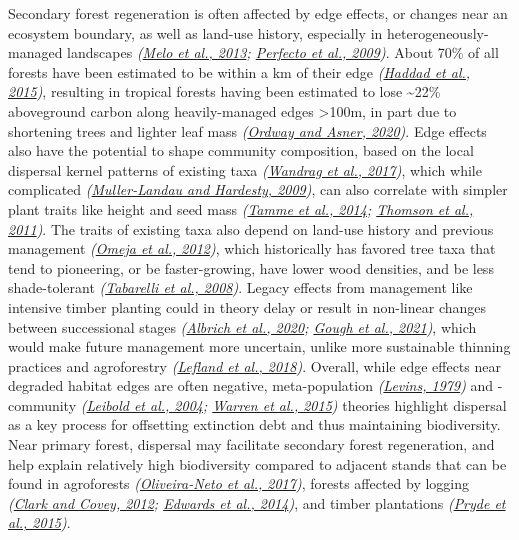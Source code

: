 \documentclass[
  12pt,
]{article}
\begin{document}
Secondary forest regeneration is often affected by edge effects, or changes near an ecosystem boundary, as well as land-use history, especially in heterogeneously-managed landscapes \emph{(\protect\hyperlink{ref-melo13}{Melo et al., 2013}; \protect\hyperlink{ref-perfecto09}{Perfecto et al., 2009})}.
About 70\% of all forests have been estimated to be within a km of their edge \emph{(\protect\hyperlink{ref-haddad15}{Haddad et al., 2015})}, resulting in tropical forests having been estimated to lose \textasciitilde22\% aboveground carbon along heavily-managed edges \textgreater100m, in part due to shortening trees and lighter leaf mass \emph{(\protect\hyperlink{ref-ordway20}{Ordway and Asner, 2020})}.
Edge effects also have the potential to shape community composition, based on the local dispersal kernel patterns of existing taxa \emph{(\protect\hyperlink{ref-wandrag17}{Wandrag et al., 2017})}, which while complicated \emph{(\protect\hyperlink{ref-muller-landau09}{Muller-Landau and Hardesty, 2009})}, can also correlate with simpler plant traits like height and seed mass \emph{(\protect\hyperlink{ref-tamme14}{Tamme et al., 2014}; \protect\hyperlink{ref-thomson11}{Thomson et al., 2011})}.
The traits of existing taxa also depend on land-use history and previous management \emph{(\protect\hyperlink{ref-omeja12}{Omeja et al., 2012})}, which historically has favored tree taxa that tend to pioneering, or be faster-growing, have lower wood densities, and be less shade-tolerant \emph{(\protect\hyperlink{ref-tabarelli08}{Tabarelli et al., 2008})}.
Legacy effects from management like intensive timber planting could in theory delay or result in non-linear changes between successional stages \emph{(\protect\hyperlink{ref-albrich20}{Albrich et al., 2020}; \protect\hyperlink{ref-gough21}{Gough et al., 2021})}, which would make future management more uncertain, unlike more sustainable thinning practices and agroforestry \emph{(\protect\hyperlink{ref-lefland18}{Lefland et al., 2018})}.
Overall, while edge effects near degraded habitat edges are often negative, meta-population \emph{(\protect\hyperlink{ref-levins79}{Levins, 1979})} and -community \emph{(\protect\hyperlink{ref-leibold04}{Leibold et al., 2004}; \protect\hyperlink{ref-warren15}{Warren et al., 2015})} theories highlight dispersal as a key process for offsetting extinction debt and thus maintaining biodiversity.
Near primary forest, dispersal may facilitate secondary forest regeneration, and help explain relatively high biodiversity compared to adjacent stands that can be found in agroforests \emph{(\protect\hyperlink{ref-oliveira-neto17}{Oliveira-Neto et al., 2017})}, forests affected by logging \emph{(\protect\hyperlink{ref-clark12}{Clark and Covey, 2012}; \protect\hyperlink{ref-edwards14}{Edwards et al., 2014})}, and timber plantations \emph{(\protect\hyperlink{ref-pryde15}{Pryde et al., 2015})}.
\end{document}
